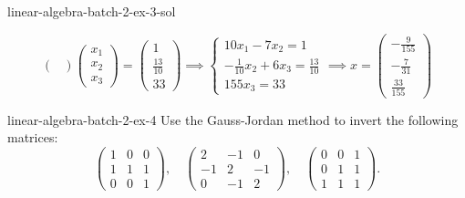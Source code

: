 \documentclass[preview]{standalone}
\begin{document}
\begin{snippetsolution}{linear-algebra-batch-2-ex-3-sol}{}
\begin{enumerate}
\[\begin{pmatrix}
            \end{pmatrix} \begin{pmatrix}
                x_1 \\ x_2 \\ x_3
            \end{pmatrix} = \begin{pmatrix}
                1 \\ \frac{13}{10} \\ 33
            \end{pmatrix} \implies
            \begin{cases}
                10x_1 - 7x_2 = 1 \\
                -\frac{1}{10}x_2 + 6x_3 = \frac{13}{10} \\
                155x_3 = 33
            \end{cases} \implies
            x = \begin{pmatrix}
                -\frac{9}{155} \\ -\frac{7}{31} \\ \frac{33}{155}
            \end{pmatrix}
        \]
    \end{enumerate}
\end{snippetsolution}

\begin{snippetexercise}{linear-algebra-batch-2-ex-4}{}
    Use the Gauss-Jordan method to invert the following matrices:
    \[
        \begin{pmatrix}
            1 & 0 & 0 \\ 1 & 1 & 1 \\ 0 & 0 & 1
        \end{pmatrix},
        \quad
        \begin{pmatrix}
            2 & -1 & 0 \\ -1 & 2 & -1 \\ 0 & -1 & 2
        \end{pmatrix},
        \quad
        \begin{pmatrix}
            0 & 0 & 1 \\ 0 & 1 & 1 \\ 1 & 1 & 1
        \end{pmatrix}.
    \]
\end{snippetexercise}
\end{document}
